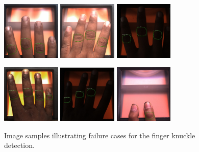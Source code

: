 \begin{figure}[h]
    \begin{center}
    \includegraphics[width=1.1in]{Figures/failure-a.png}
    \includegraphics[width=1.1in]{Figures/failure-b.png}
    \includegraphics[width=1.1in]{Figures/failure-c.png}
    
    \hspace{0.001in}
    \includegraphics[width=1.1in]{Figures/failure-d.png}
    \includegraphics[width=1.1in]{Figures/failure-e.png}
    \includegraphics[width=1.1in]{Figures/failure-f.png}
    \caption{Image samples illustrating failure cases for the finger knuckle detection.}
    \label{failure-case}
    \end{center}
\end{figure}


